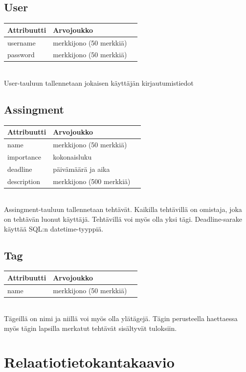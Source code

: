 \documentclass[a4paper, 12pt, finnish]{article}
\begin{document}
\subsection{User}
\begin{tabular}{l | l | l}
  Attribuutti & Arvojoukko \\ \hline
  username & merkkijono (50 merkkiä) \\ \hline
  password & merkkijono (50 merkkiä) \\
\end{tabular}
\\
User-tauluun tallennetaan jokaisen käyttäjän kirjautumistiedot

\subsection{Assingment}
\begin{tabular}{l | l | l}
  Attribuutti & Arvojoukko \\ \hline
  name & merkkijono (50 merkkiä) \\ \hline
  importance & kokonaisluku \\ \hline
  deadline & päivämäärä ja aika \\ \hline
  description & merkkijono (500 merkkiä) \\
\end{tabular}
\\
Assingment-tauluun tallennetaan tehtävät. Kaikilla tehtävillä on omistaja, joka
on tehtävän luonut käyttäjä. Tehtävillä voi myös olla yksi tägi.
Deadline-sarake käyttää SQL:n datetime-tyyppiä.

\subsection{Tag}
\begin{tabular}{l | l | l}
  Attribuutti & Arvojoukko \\ \hline
  name & merkkijono (50 merkkiä) \\
\end{tabular}
\\
Tägeillä on nimi ja niillä voi myös olla ylätägejä. Tägin perusteella haettaessa
myös tägin lapsilla merkatut tehtävät sisältyvät tuloksiin.

\section{Relaatiotietokantakaavio}
\end{document}
